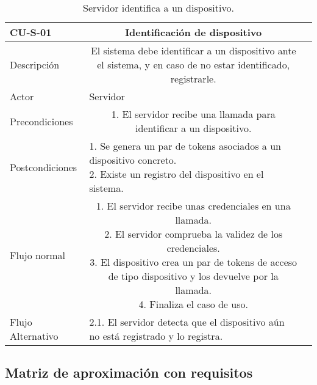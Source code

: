 \begin{table}[]
\centering
	\setlength{\extrarowheight}{3pt}
		\begin{tabular}{rc{1.85cm}|c{8cm}}
	    \hline
        \multicolumn{1}{|l}{ \textbf{CU-S-01}}     & \multicolumn{1}{c|}{\textbf{Identificación de dispositivo} } \\
	    \hline \hline
	    \multicolumn{1}{|l}{Descripción}     & \multicolumn{1}{Y|}{
	    El sistema debe identificar a un dispositivo ante el sistema, y en caso de no estar identificado, registrarle.
	    }  \\ \cline{1-2}
	    \multicolumn{1}{|l}{Actor}           & \multicolumn{1}{l|}{Servidor}  \\ \cline{1-2}
	    \multicolumn{1}{|l}{Precondiciones}  & \multicolumn{1}{Y|}{
1. El servidor recibe una llamada para identificar a un dispositivo.}  \\ \cline{1-2}
	    \multicolumn{1}{|l}{Postcondiciones} & \multicolumn{1}{l|}{
1. Se genera un par de tokens asociados a un dispositivo concreto.\newline
2. Existe un registro del dispositivo en el sistema.}\\ \cline{1-2}
	    \multicolumn{1}{|l}{Flujo normal}    & \multicolumn{1}{Y|}{
1. El servidor recibe unas credenciales en una llamada. \newline
2. El servidor comprueba la validez de los credenciales. \newline
3. El dispositivo crea un par de tokens de acceso de tipo dispositivo y los devuelve por la llamada. \newline
4. Finaliza el caso de uso.
	    } \\ \cline{1-2}
	    \multicolumn{1}{|l}{Flujo Alternativo} & \multicolumn{1}{l|}{
2.1. El servidor detecta que el dispositivo aún no está registrado y lo registra.
	    }\\ \cline{1-2}
	    \hline
	    \end{tabular}
	\label{table:cu-d-03}
	\caption{Servidor identifica a un dispositivo.}
\end{table}

\subsection{Matriz de aproximación con requisitos}